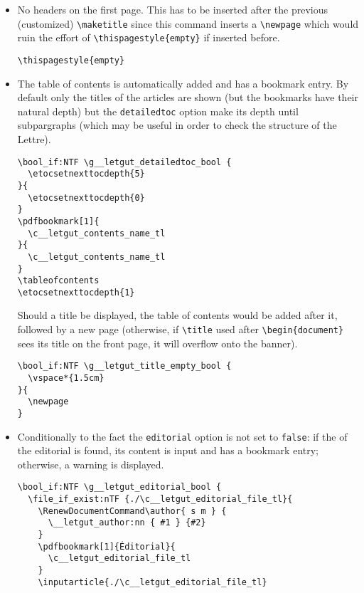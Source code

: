 \documentclass{letgut}
\begin{document}
\begin{itemize}
\item No headers on the first page. This has to be inserted after the previous
(customized) \lstinline+\maketitle+ since this command inserts a \lstinline+\newpage+ which would
ruin the effort of \lstinline+\thispagestyle{empty}+ if inserted before.
\begin{lstlisting}
\thispagestyle{empty}
\end{lstlisting}
\item The table of contents is automatically added and has a bookmark entry. By
default only the titles of the articles are shown (but the bookmarks have
their natural depth) but the \lstinline+detailedtoc+ option make its depth until
subpargraphs (which may be useful in order to check the structure of the
Lettre).
\begin{lstlisting}
\bool_if:NTF \g__letgut_detailedtoc_bool {
  \etocsetnexttocdepth{5}
}{
  \etocsetnexttocdepth{0}
}
\pdfbookmark[1]{
  \c__letgut_contents_name_tl
}{
  \c__letgut_contents_name_tl
}
\tableofcontents
\etocsetnexttocdepth{1}
\end{lstlisting}
Should a title be displayed, the table of contents would be added after it,
followed by a new page (otherwise, if \lstinline+\title+ used after \lstinline+\begin{document}+
sees its title on the front page, it will overflow onto the banner).
\begin{lstlisting}
\bool_if:NTF \g__letgut_title_empty_bool {
  \vspace*{1.5cm}
}{
  \newpage
}
\end{lstlisting}
\item Conditionally to the fact the \lstinline+editorial+ option is not set to \lstinline+false+: if the
 of the editorial is found, its content is input and
has a bookmark entry; otherwise, a warning is displayed.
\begin{lstlisting}
\bool_if:NTF \g__letgut_editorial_bool {
  \file_if_exist:nTF {./\c__letgut_editorial_file_tl}{
    \RenewDocumentCommand\author{ s m } {
      \__letgut_author:nn { #1 } {#2}
    }
    \pdfbookmark[1]{Éditorial}{
      \c__letgut_editorial_file_tl
    }
    \inputarticle{./\c__letgut_editorial_file_tl}
\end{lstlisting}
\end{itemize}
\end{document}
